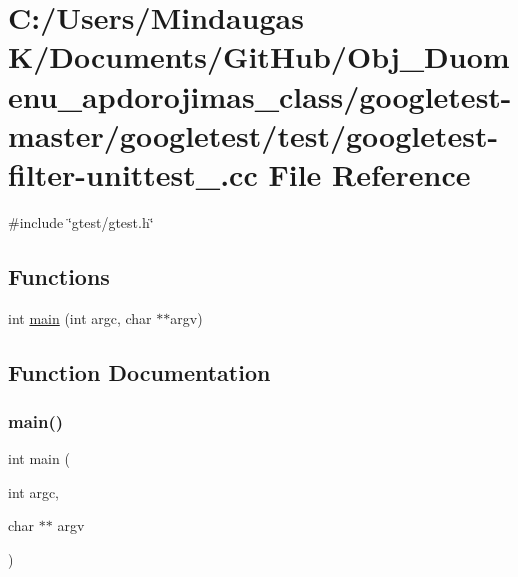 \hypertarget{googletest-master_2googletest_2test_2googletest-filter-unittest___8cc}{}\section{C\+:/\+Users/\+Mindaugas K/\+Documents/\+Git\+Hub/\+Obj\+\_\+\+Duomenu\+\_\+apdorojimas\+\_\+class/googletest-\/master/googletest/test/googletest-\/filter-\/unittest\+\_\+.cc File Reference}
\label{googletest-master_2googletest_2test_2googletest-filter-unittest___8cc}
{\ttfamily \#include \char`\"{}gtest/gtest.\+h\char`\"{}}\newline
\subsection*{Functions}
\begin{DoxyCompactItemize}
\item 
int \mbox{\hyperlink{googletest-master_2googletest_2test_2googletest-filter-unittest___8cc_a3c04138a5bfe5d72780bb7e82a18e627}{main}} (int argc, char $\ast$$\ast$argv)
\end{DoxyCompactItemize}


\subsection{Function Documentation}
\mbox{\label{googletest-master_2googletest_2test_2googletest-filter-unittest___8cc_a3c04138a5bfe5d72780bb7e82a18e627}} 
\subsubsection{\texorpdfstring{main()}{main()}}
{\footnotesize\ttfamily int main (\begin{DoxyParamCaption}\item[{int}]{argc,  }\item[{char $\ast$$\ast$}]{argv }\end{DoxyParamCaption})}

